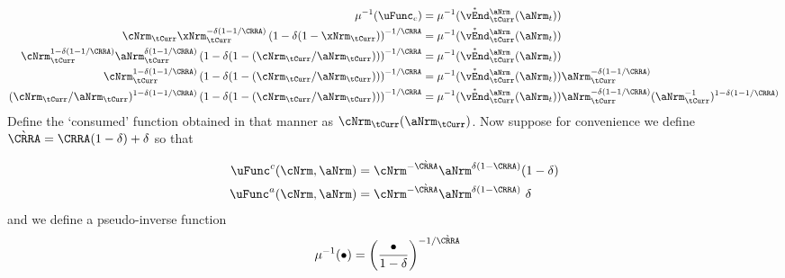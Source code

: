 \documentclass[./SolvingMicroDSOPs]{subfiles}
\begin{document}
{{      \begin{align}
        \muInv(\uFunc_{c}) & = \muInv(\Maxed{\vEnd}^{\aNrm}_{\tCurr}(\aNrm_{t}))
        \\ \cNrm_{\tCurr} \xNrm_{\tCurr}^{-\wealthU(1-1/\CRRA)} \left(1-\wealthU(1-\xNrm_{\tCurr})\right)^{-1/\CRRA} & = \muInv(\Maxed{\vEnd}^{\aNrm}_{\tCurr}(\aNrm_{t})) \notag
        \\ \cNrm_{\tCurr}^{1-\wealthU(1-1/\CRRA)} \aNrm_{\tCurr}^{\wealthU(1-1/\CRRA)} \left(1-\wealthU(1-(\cNrm_{\tCurr}/\aNrm_{\tCurr}))\right)^{-1/\CRRA} & = \muInv(\Maxed{\vEnd}^{\aNrm}_{\tCurr}(\aNrm_{t})) \notag
        \\ \cNrm_{\tCurr}^{1-\wealthU(1-1/\CRRA)}  \left(1-\wealthU(1-(\cNrm_{\tCurr}/\aNrm_{\tCurr}))\right)^{-1/\CRRA} & = \muInv(\Maxed{\vEnd}^{\aNrm}_{\tCurr}(\aNrm_{t})) \aNrm_{\tCurr}^{-\wealthU(1-1/\CRRA)} \notag 
        \\ (\cNrm_{\tCurr}/\aNrm_{\tCurr})^{1-\wealthU(1-1/\CRRA)}  \left(1-\wealthU(1-(\cNrm_{\tCurr}/\aNrm_{\tCurr}))\right)^{-1/\CRRA} & = \muInv(\Maxed{\vEnd}^{\aNrm}_{\tCurr}(\aNrm_{t})) \aNrm_{\tCurr}^{-\wealthU(1-1/\CRRA)}(\aNrm_{\tCurr}^{-1})^{1-\wealthU(1-1/\CRRA)} \notag
                               \notag
      \end{align}
      Define the `consumed' function obtained in that manner as $\mathfrak{\cNrm}_{\tCurr}(\aNrm_{\tCurr})$.
    }{}
  } %
  { %
  }
  Now suppose for convenience we define $\grave{\CRRA}=\CRRA(1-\wealthU)+\wealthU$ so that
  
  \begin{align}
    \uFunc^{c}(\cNrm,\aNrm) & = \cNrm^{-\grave{\CRRA}}\aNrm^{\wealthU(1-\CRRA)}(1- \wealthU)
    \\    \uFunc^{a}(\cNrm,\aNrm) & = \cNrm^{-\grave{\CRRA}}\aNrm^{\wealthU(1-\CRRA)}\phantom{~}\wealthU
  \end{align}
  and we define a pseudo-inverse function
  \begin{align}
    \muInv(\bullet) &= \left(\frac{\bullet}{1-\wealthU}\right)^{-1/\grave{\CRRA}} 
  \end{align}
  
\end{document}
